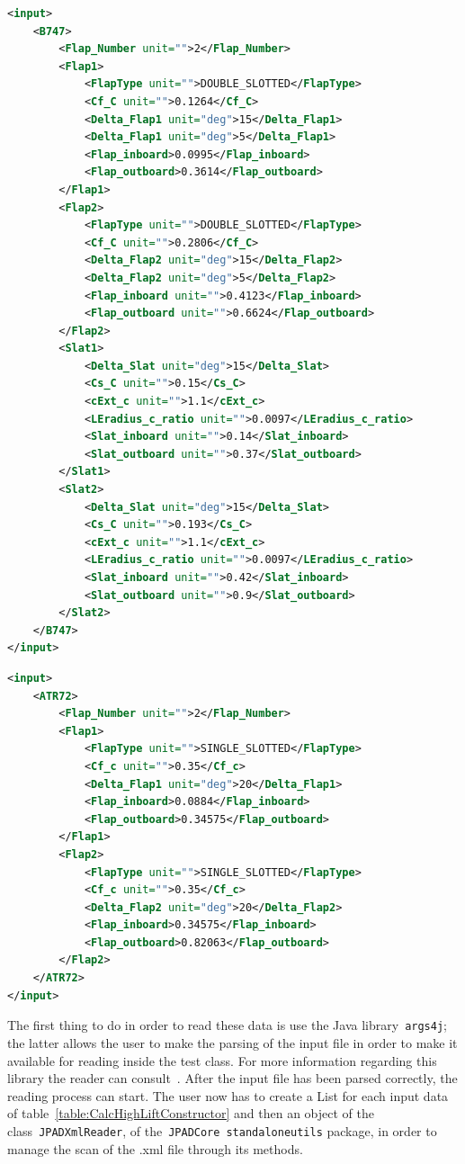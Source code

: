 \bigskip
\begin{lstlisting}[caption={Example of high-lift devices .xml input file for the B747-100B in take-off configuration}, captionpos=b, tabsize=6, language=XML]
<input>
	<B747>
		<Flap_Number unit="">2</Flap_Number>
		<Flap1>
			<FlapType unit="">DOUBLE_SLOTTED</FlapType>
			<Cf_C unit="">0.1264</Cf_C>
			<Delta_Flap1 unit="deg">15</Delta_Flap1>
			<Delta_Flap1 unit="deg">5</Delta_Flap1>
			<Flap_inboard>0.0995</Flap_inboard>
			<Flap_outboard>0.3614</Flap_outboard>
		</Flap1>
		<Flap2>
			<FlapType unit="">DOUBLE_SLOTTED</FlapType>
			<Cf_C unit="">0.2806</Cf_C>
			<Delta_Flap2 unit="deg">15</Delta_Flap2>
			<Delta_Flap2 unit="deg">5</Delta_Flap2>
			<Flap_inboard unit="">0.4123</Flap_inboard>
			<Flap_outboard unit="">0.6624</Flap_outboard>
		</Flap2>
		<Slat1>
			<Delta_Slat unit="deg">15</Delta_Slat>
			<Cs_C unit="">0.15</Cs_C>
			<cExt_c unit="">1.1</cExt_c>
			<LEradius_c_ratio unit="">0.0097</LEradius_c_ratio>
			<Slat_inboard unit="">0.14</Slat_inboard>
			<Slat_outboard unit="">0.37</Slat_outboard>
		</Slat1>
		<Slat2>
			<Delta_Slat unit="deg">15</Delta_Slat>
			<Cs_C unit="">0.193</Cs_C>
			<cExt_c unit="">1.1</cExt_c>
			<LEradius_c_ratio unit="">0.0097</LEradius_c_ratio>
			<Slat_inboard unit="">0.42</Slat_inboard>
			<Slat_outboard unit="">0.9</Slat_outboard>
		</Slat2>
	</B747>
</input>
\end{lstlisting}

\bigskip
\begin{lstlisting}[caption={Example of high-lift devices .xml input file for the ATR-72 in take-off configuration}, captionpos=b, tabsize=6, language=XML]
<input>
	<ATR72>
		<Flap_Number unit="">2</Flap_Number>
		<Flap1>
			<FlapType unit="">SINGLE_SLOTTED</FlapType>
			<Cf_c unit="">0.35</Cf_c>
			<Delta_Flap1 unit="deg">20</Delta_Flap1>
			<Flap_inboard>0.0884</Flap_inboard>
			<Flap_outboard>0.34575</Flap_outboard>
		</Flap1>
		<Flap2>
			<FlapType unit="">SINGLE_SLOTTED</FlapType>
			<Cf_c unit="">0.35</Cf_c>
			<Delta_Flap2 unit="deg">20</Delta_Flap2>
			<Flap_inboard>0.34575</Flap_inboard>
			<Flap_outboard>0.82063</Flap_outboard>
		</Flap2>
	</ATR72>
</input>
\end{lstlisting}

\bigskip
\noindent
The first thing to do in order to read these data is use the Java library~\lstinline[language=Java]!args4j!; the latter allows the user to make the \gls{parsing} of the input file in order to make it available for reading inside the test class. For more information regarding this library the reader can consult~\cite{args4j}.
%
After the input file has been parsed correctly, the reading process can start. The user now has to create a \gls{List} for each input data of table~\ref{table:CalcHighLiftConstructor} and then an object of the class~\lstinline[language=Java]!JPADXmlReader!, of the~\lstinline[language=Java]!JPADCore!~\lstinline[language=Java]!standaloneutils! package, in order to manage the scan of the .xml file through its methods. 

